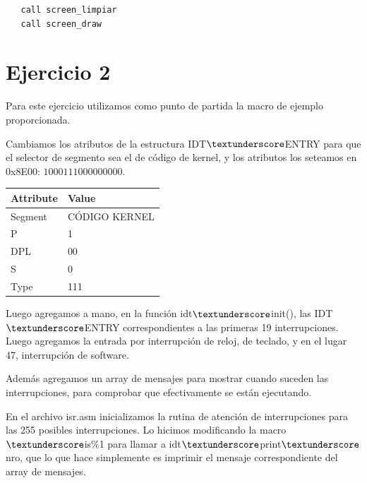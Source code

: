 \documentclass[a4paper]{article}
\newenvironment{codesnippet}{%
	\begin{Sbox}\begin{minipage}{\textwidth}\sffamily\small}%
	{\end{minipage}\end{Sbox}%
		\begin{center}%
		\vspace{-0.4cm}\colorbox{litegrey}{\TheSbox}\end{center}\vspace{0.3cm}}
\begin{document}
\begin{codesnippet}
  \begin{verbatim}
   call screen_limpiar
   call screen_draw
  \end{verbatim}
\end{codesnippet}

\section{Ejercicio 2}

Para este ejercicio utilizamos como punto de partida la macro de ejemplo proporcionada.

Cambiamos los atributos de la estructura IDT$\textunderscore$ENTRY para que el selector de segmento sea el de código de
kernel, y los atributos los seteamos en 0x8E00: $1000 1110 0000 0000$.

\begin{table}[h!]
  \begin{center}
    \label{tab:table1}
    \begin{tabular}{l|l} %
      \textbf{Attribute} & \textbf{Value}\\
      \hline
      Segment & CÓDIGO KERNEL\\
      P & 1\\
      DPL & 00\\
      S & 0\\
      Type & 111\\
    \end{tabular}
  \end{center}
\end{table}


Luego agregamos a mano, en la función idt$\textunderscore$init(), las IDT$\textunderscore$ENTRY correspondientes a las
primeras 19 interrupciones. Luego agregamos la entrada por interrupción de reloj, de teclado, y en el lugar 47,
interrupción de software.

Además agregamos un array de mensajes para mostrar cuando suceden las interrupciones, para comprobar que efectivamente
se están ejecutando.

En el archivo isr.asm inicializamos la rutina de atención de interrupciones para las 255 posibles interrupciones. Lo
hicimos modificando la macro $\textunderscore$is\%1 para llamar a idt$\textunderscore$print$\textunderscore$nro, que lo
que hace simplemente es imprimir el mensaje correspondiente del array de mensajes.
\end{document}
